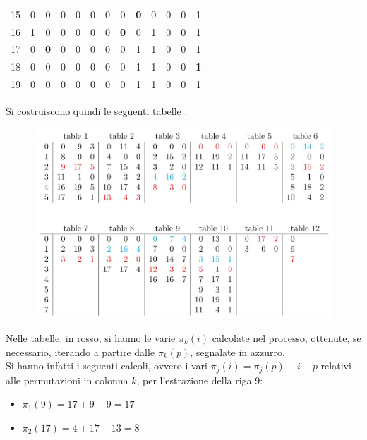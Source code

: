\begin{esempio}
\begin{table}[H]
\begin{tabular}{c|ccccccccccccccc}
      15 & 0 & 0 & 0 & 0 & 0 & 0 & 0 & {\color{nordred}\textbf{0}} & 0 & 0 & 0
                                                               & 1 \\
      16 & 1 & 0 & 0 & 0 & 0 & 0 & {\color{nordred}\textbf{0}} & 0 & 1 & 0 & 0
                                                               & 1 \\
      17 & 0 & {\color{nordred}\textbf{0}} & 0 & 0 & 0 & 0 & 0 & 1 & 1 & 0 & 0
                                                               & 1 \\
      18 & 0 & 0 & 0 & 0 & 0 & 0 & 0 & 1 & 1 & 0 & 0
                                         & {\color{nordred}\textbf{1}} \\ 
      19 & 0 & 0 & 0 & 0 & 0 & 0 & 0 & 1 & 1 & 0 & 0 & 1 \\
    \end{tabular}
  \end{table}
  Si costruiscono quindi le seguenti tabelle \cite{tricks}:
   \begin{figure}[H]
    \centering
    \includegraphics[scale=0.3]{img/trick.jpg}
  \end{figure}
  Nelle tabelle, in rosso, si hanno le varie $\pi_k(i)$ calcolate nel processo,
  ottenute, 
  se necessario, iterando a partire dalle $\pi_k(p)$, segnalate in azzurro. \\
  Si hanno infatti i seguenti calcoli, ovvero i vari $\pi_j(i)=\pi_j(p)+i-p$ 
  relativi alle permutazioni in colonna $k$, per l'estrazione della riga $9$:
  \begin{multicols}{2}
    \begin{itemize}
      \item $\pi_1(9)=17+9-9=17$
      \item $\pi_2(17)=4+17-13=8$

\end{itemize}
\end{multicols}
\end{esempio}
